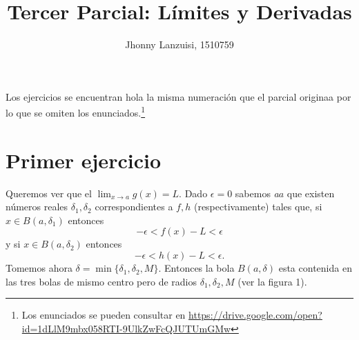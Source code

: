 \documentclass[fleqn,leqno,10pt,letterpaper,final]{article}
\title{Tercer Parcial: Límites y Derivadas}
\author{Jhonny Lanzuisi, 1510759}
\begin{document}
\maketitle
\tableofcontents

\noindent
Los ejercicios se encuentran hola la misma numeración que el parcial originaa
por lo que se omiten los enunciados.\footnote{Los enunciados se pueden consultar en \url{https://drive.google.com/open?id=1dLlM9mbx058RTI-9UlkZwFcQJUTUmGMw}} 
\section{Primer ejercicio}
Queremos ver que el $ \lim_{x\to a} g(x)=L$. Dado $\epsilon =0$ sabemos \textit{a}$a$ que existen números reales
$\delta_1,\delta_2$ correspondientes a $f,h$ (respectivamente) tales que, si $x\in B(a,\delta_1)$ entonces
\[
	-\epsilon<f(x)-L<\epsilon
\]
y si $x\in B(a,\delta_2)$ entonces
\[
	-\epsilon<h(x)-L<\epsilon.
\]
Tomemos ahora $\delta=\min\{\delta_1,\delta_2,M\}$. Entonces la bola $B(a,\delta)$ esta contenida 
en las tres bolas de mismo centro pero de radios $\delta_1,\delta_2,M$ (ver la figura 1).%
%
\end{document}
